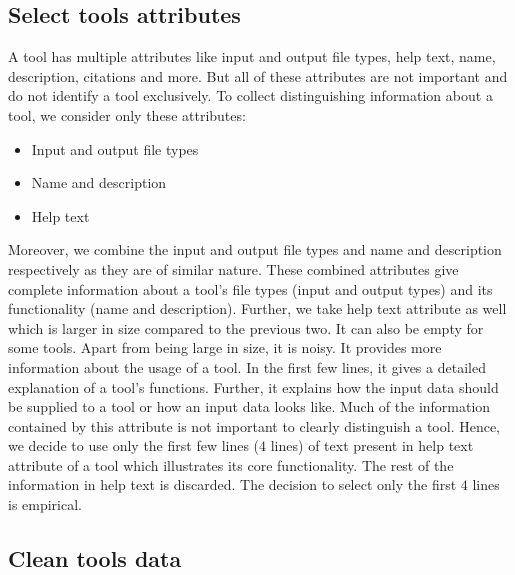 \subsection{Select tools attributes}
A tool has multiple attributes like input and output file types, help text, name, description, citations and more. But all of these attributes are not important and do not identify a tool exclusively. To collect distinguishing information about a tool, we consider only these attributes:
\begin{itemize}
	\item Input and output file types
	\item Name and description
	\item Help text
\end{itemize}
Moreover, we combine the input and output file types and name and description respectively as they are of similar nature. These combined attributes give complete information about a tool's file types (input and output types) and its functionality (name and description). Further, we take help text attribute as well which is larger in size compared to the previous two. It can also be empty for some tools. Apart from being large in size, it is noisy. It provides more information about the usage of a tool. In the first few lines, it gives a detailed explanation of a tool's functions. Further, it explains how the input data should be supplied to a tool or how an input data looks like. Much of the information contained by this attribute is not important to clearly distinguish a tool. Hence, we decide to use only the first few lines ($4$ lines) of text present in help text attribute of a tool which illustrates its core functionality. The rest of the information in help text is discarded. The decision to select only the first $4$ lines is empirical.

\subsection{Clean tools data}
